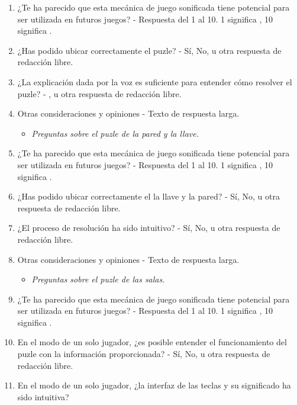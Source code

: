 \begin{enumerate}
	\begin{itemize}
		\item \textit{Preguntas sobre el puzle de la pesca.}
	\end{itemize}
	\item ¿Te ha parecido que esta mecánica de juego sonificada tiene potencial para ser utilizada en futuros juegos?
	\subitem- Respuesta del 1 al 10. 1 significa , 10 significa .
	\item ¿Has podido ubicar correctamente el puzle?
	\subitem- Sí, No, u otra respuesta de redacción libre.
	\item ¿La explicación dada por la voz es suficiente para entender cómo resolver el puzle?
	\subitem- ,  u otra respuesta de redacción libre.
	\item Otras consideraciones y opiniones
	\subitem- Texto de respuesta larga.
	\begin{itemize}
		\item \textit{Preguntas sobre el puzle de la pared y la llave.}
	\end{itemize}
	\item ¿Te ha parecido que esta mecánica de juego sonificada tiene potencial para ser utilizada en futuros juegos?
	\subitem- Respuesta del 1 al 10. 1 significa , 10 significa .
	\item ¿Has podido ubicar correctamente el la llave  y la pared?
	\subitem- Sí, No, u otra respuesta de redacción libre.
	\item ¿El proceso de resolución ha sido intuitivo?
	\subitem- Sí, No, u otra respuesta de redacción libre.
	\item Otras consideraciones y opiniones
	\subitem- Texto de respuesta larga.
	\begin{itemize}
		\item \textit{Preguntas sobre el puzle de las salas.}
	\end{itemize}
	\item ¿Te ha parecido que esta mecánica de juego sonificada tiene potencial para ser utilizada en futuros juegos?
	\subitem- Respuesta del 1 al 10. 1 significa , 10 significa .
	\item En el modo de un solo jugador, ¿es posible entender el funcionamiento del puzle con la información proporcionada?
	\subitem- Sí, No, u otra respuesta de redacción libre.
	\item En el modo de un solo jugador, ¿la interfaz de las teclas y su significado ha sido intuitiva?

\end{enumerate}

